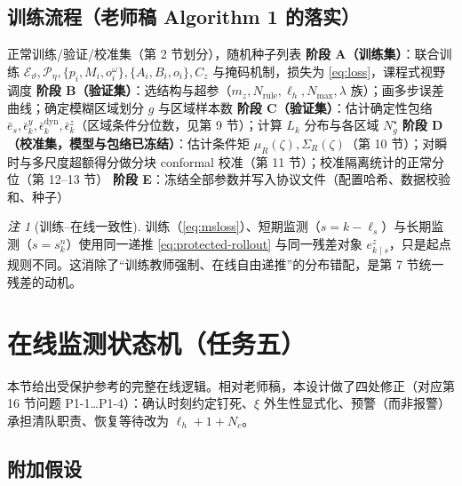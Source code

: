\documentclass[11pt,a4paper]{ctexart}
\theoremstyle{remark}
\newtheorem{remark}{注}
\newcommand{\Enc}{\mathcal{E}_{\vartheta}}
\newcommand{\Prem}{\mathcal{P}_{\eta}}
\begin{document}
\subsection{训练流程（老师稿 Algorithm 1 的落实）}\label{sec:train-reg}

\begin{algorithm}[H]
\caption{仅正常数据的离线设计流程}
\begin{algorithmic}[1]
\Require 正常训练/验证/校准集（第 2 节划分），随机种子列表
\State \textbf{阶段 A（训练集）}：联合训练 $\Enc,\Prem,\{p_i,M_i,o^\omega_i\},\{A_i,B_i,o_i\},C_z$ 与掩码机制，损失为 \eqref{eq:loss}，课程式视野调度
\State \textbf{阶段 B（验证集）}：选结构与超参（$m_z,N_{\mathrm{rule}},\ell_h,N_{\max},\lambda$ 族）；画多步误差曲线；确定模糊区域划分 $g$ 与区域样本数
\State \textbf{阶段 C（验证集）}：估计确定性包络 $\bar e_s,\bar\epsilon^y_k,\bar\epsilon^{\mathrm{dyn}}_k,\bar\epsilon^z_k$（区域条件分位数，见第 9 节）；计算 $L_k$ 分布与各区域 $N^\star_g$
\State \textbf{阶段 D（校准集，模型与包络已冻结）}：估计条件矩 $\mu_R(\zeta),\Sigma_R(\zeta)$（第 10 节）；对瞬时与多尺度超额得分做分块 conformal 校准（第 11 节）；校准隔离统计的正常分位（第 12--13 节）
\State \textbf{阶段 E}：冻结全部参数并写入协议文件（配置哈希、数据校验和、种子）
\end{algorithmic}
\end{algorithm}

\begin{remark}[训练--在线一致性]
训练（\ref{eq:msloss}）、短期监测（$s=k-\ell_s$）与长期监测（$s=s^n_k$）使用同一递推 \eqref{eq:protected-rollout} 与同一残差对象 $e^z_{k\mid s}$，只是起点规则不同。这消除了“训练教师强制、在线自由递推”的分布错配，是第 7 节统一残差的动机。
\end{remark}

\section{在线监测状态机（任务五）}

本节给出受保护参考的完整在线逻辑。相对老师稿，本设计做了四处修正（对应第 16 节问题 P1-1…P1-4）：确认时刻约定钉死、$\xi$ 外生性显式化、预警（而非报警）承担清队职责、恢复等待改为 $\ell_h{+}1{+}N_c$。

\subsection{附加假设}
\end{document}
